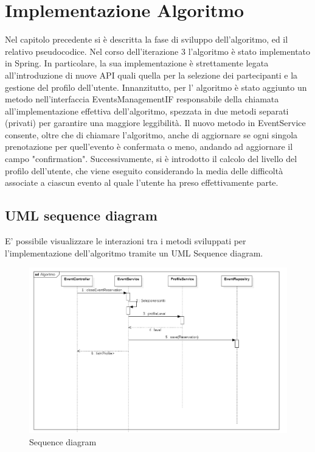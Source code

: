 \section{Implementazione Algoritmo}
Nel capitolo precedente si è descritta la fase di sviluppo dell'algoritmo, ed il relativo pseudocodice.
Nel corso dell'iterazione 3 l'algoritmo è stato implementato in Spring. In particolare, la sua implementazione è strettamente legata
all'introduzione di nuove API quali quella per la selezione dei partecipanti e la gestione del profilo dell'utente.
Innanzitutto, per l' algoritmo è stato aggiunto un metodo nell'interfaccia EventsManagementIF responsabile della chiamata all'implementazione
effettiva dell'algoritmo, spezzata in due metodi separati (privati) per garantire una maggiore leggibilità. Il nuovo metodo
in EventService consente, oltre che di chiamare l'algoritmo, anche di aggiornare se ogni singola prenotazione per quell'evento 
è confermata o meno, andando ad aggiornare il campo "confirmation".
Successivamente, si è introdotto il calcolo del livello del profilo dell'utente, che viene eseguito considerando la media delle difficoltà
associate a ciascun evento al quale l'utente ha preso effettivamente parte.
\newpage
\subsection{UML sequence diagram}
E' possibile visualizzare le interazioni tra i metodi sviluppati per l'implementazione dell'algoritmo tramite un UML Sequence diagram.
\begin{center}
\begin{figure}[h!]
    \includegraphics[width=1\textwidth]{Iterazione 3/images/sequence_diagram.png}
    \caption{Sequence diagram}\label{fig:seq}
  \end{figure}
\end{center}
